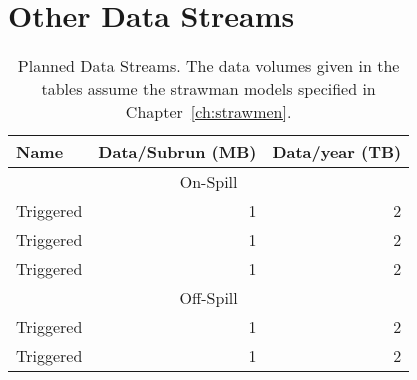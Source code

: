 \section{Other Data Streams}
\label{sec:Other_data_streams}

\begin{table}
\begin{center}
  \caption[Planned Data Streams]{Planned Data Streams. The data volumes given in the tables
    assume the strawman models specified in Chapter~\ref{ch:strawmen}.}
\label{tab:dataStreams}
\begin{tabular}{lrr}\hline
  Name & Data/Subrun (MB) & Data/year (TB) \\ \hline
  \multicolumn{3}{c}{On-Spill} \\
 Triggered &  1 & 2 \\
 Triggered &  1 & 2 \\
 Triggered &  1 & 2 \\ \hline 
  \multicolumn{3}{c}{Off-Spill} \\
 Triggered &  1 & 2 \\
 Triggered &  1 & 2 \\
\hline 
  \end{tabular}
\end{center}
\end{table}

